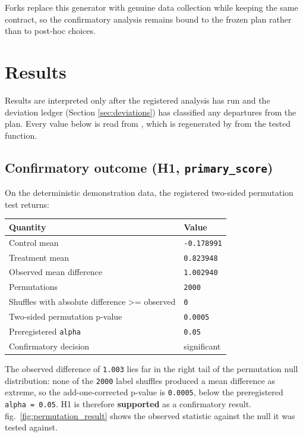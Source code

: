 \documentclass[
]{article}
\newcounter{none} %
\begin{document}
Forks replace this generator with genuine data collection while keeping
the same  contract, so the
confirmatory analysis remains bound to the frozen plan rather than to
post-hoc choices.

\newpage

\section{Results}\label{sec:results}

Results are interpreted only after the registered analysis has run and
the deviation ledger (Section \ref{sec:deviations}) has classified any
departures from the plan. Every value below is read from
, which is regenerated by
 from the tested
 function.

\subsection{\texorpdfstring{Confirmatory outcome (H1,
\texttt{primary\_score})}{Confirmatory outcome (H1, primary_score)}}\label{confirmatory-outcome-h1-primary_score}

On the deterministic demonstration data, the registered two-sided
permutation test returns:

{\def\LTcaptype{none} %
\begin{longtable}[]{@{}ll@{}}
\toprule\noalign{}
Quantity & Value \\
\midrule\noalign{}
\endhead
\bottomrule\noalign{}
\endlastfoot
Control mean & \texttt{-0.178991} \\
Treatment mean & \texttt{0.823948} \\
Observed mean difference & \texttt{1.002940} \\
Permutations & \texttt{2000} \\
Shuffles with absolute difference \texorpdfstring{\textgreater{}=}{>=} observed & \texttt{0} \\
Two-sided permutation p-value & \texttt{0.0005} \\
Preregistered \texttt{alpha} & \texttt{0.05} \\
Confirmatory decision & significant \\
\end{longtable}
}

The observed difference of \texttt{1.003} lies far in the right tail of
the permutation null distribution: none of the \texttt{2000} label
shuffles produced a mean difference as extreme, so the add-one-corrected
p-value is \texttt{0.0005}, below the preregistered
\texttt{alpha\ =\ 0.05}. H1 is therefore \textbf{supported} as a
confirmatory result. fig.~\ref{fig:permutation_result} shows the
observed statistic against the null it was tested against.
\end{document}
